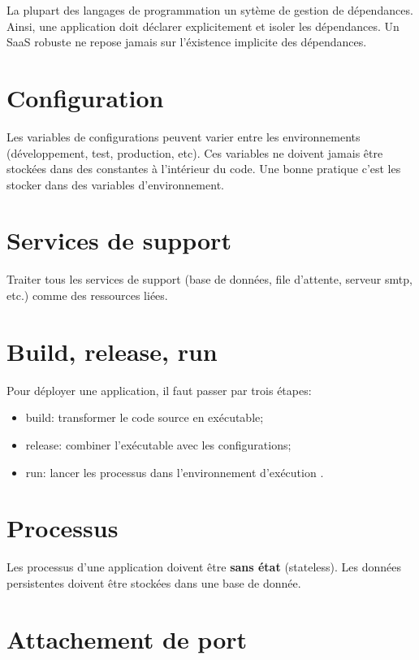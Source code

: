 La plupart des langages de programmation un sytème de gestion de dépendances. Ainsi, une application doit déclarer explicitement et isoler les dépendances. Un SaaS robuste ne repose jamais sur l'éxistence implicite des dépendances. 

\section*{Configuration}

Les variables de configurations peuvent varier entre les environnements (développement, test, production, etc). Ces variables ne doivent jamais être stockées dans des constantes à l'intérieur du code. Une bonne pratique c'est les stocker dans des variables d'environnement.

\section*{Services de support}

Traiter tous les services de support (base de données, file d'attente, serveur \acrshort{smtp}, etc.)  comme des ressources liées.

\section*{Build, release, run}

Pour déployer une application, il faut passer par trois étapes:
\begin{itemize}
	\item build: transformer le code source en exécutable;
	\item release: combiner l'exécutable avec les configurations;
	\item run: lancer les processus dans l'environnement d'exécution .
\end{itemize}


\section*{Processus}

Les processus d'une application doivent être \textbf{sans état} (stateless). Les données persistentes doivent être stockées dans une base de donnée.

\section*{Attachement de port}

